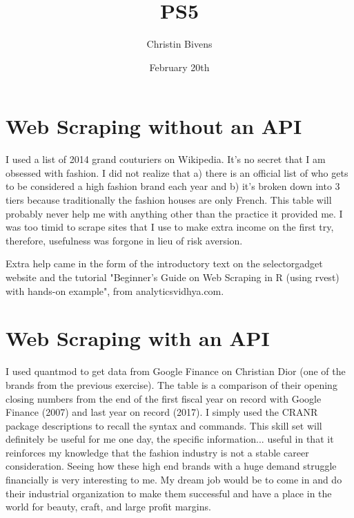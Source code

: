 \documentclass{article}
\title{PS5}
\author{Christin Bivens}
\date{February 20th}
\begin{document}
\maketitle

\section{Web Scraping without an API}

I used a list of 2014 grand couturiers on Wikipedia. It's no secret that I am obsessed with fashion. I did not realize that a) there is an official list of who gets to be considered a high fashion brand each year and b) it's broken down into 3 tiers because traditionally the fashion houses are only French. This table will probably never help me with anything other than the practice it provided me. I was too timid to scrape sites that I use to make extra income on the first try, therefore, usefulness was forgone in lieu of risk aversion.

Extra help came in the form of the introductory text on the selectorgadget website and the tutorial "Beginner’s Guide on Web Scraping in R (using rvest) with hands-on example", from analyticsvidhya.com.

\section{Web Scraping with an API}

I used quantmod to get data from Google Finance on Christian Dior (one of the brands from the previous exercise).
The table is a comparison of their opening closing numbers from the end of the first fiscal year on record with Google Finance (2007) and last year on record (2017).
I simply used the CRANR package descriptions to recall the syntax and commands. 
This skill set will definitely be useful for me one day, the specific information... useful in that it reinforces my knowledge that the fashion industry is not a stable career consideration.
Seeing how these high end brands with a huge demand struggle financially is very interesting to me. My dream job would be to come in and do their industrial organization to make them successful and have a place in the world for beauty, craft, and large profit margins.
\end{document}
